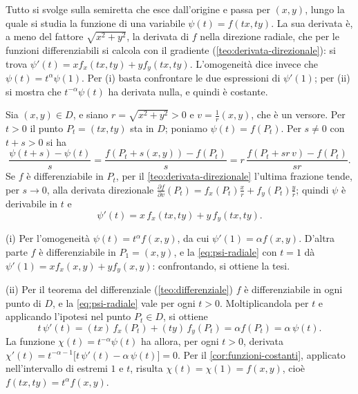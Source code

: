 \begin{schema}
\end{schema}

\begin{strategia}
Tutto si svolge sulla semiretta che esce dall'origine e passa per $(x,y)$, lungo la quale
si studia la funzione di una variabile $\psi(t)=f(tx,ty)$. La sua derivata è, a meno del
fattore $\sqrt{x^{2}+y^{2}}$, la derivata di $f$ nella direzione radiale, che per le
funzioni differenziabili si calcola con il gradiente (\cref{teo:derivata-direzionale}):
si trova $\psi'(t)=xf_{x}(tx,ty)+yf_{y}(tx,ty)$. L'omogeneità dice invece che
$\psi(t)=t^{\alpha}\psi(1)$. Per (i) basta confrontare le due espressioni di $\psi'(1)$; per
(ii) si mostra che $t^{-\alpha}\psi(t)$ ha derivata nulla, e quindi è costante.
\end{strategia}

\begin{dimostrazione}
Sia $(x,y)\in D$, e siano $r=\sqrt{x^{2}+y^{2}}>0$ e
$v=\frac1r(x,y)$, che è un versore. Per $t>0$ il punto $P_{t}=(tx,ty)$ sta in $D$; poniamo
$\psi(t)=f(P_{t})$. Per $s\neq0$ con $t+s>0$ si ha
\[
  \frac{\psi(t+s)-\psi(t)}{s}=\frac{f(P_{t}+s(x,y))-f(P_{t})}{s}
  =r\,\frac{f(P_{t}+sr\,v)-f(P_{t})}{sr} .
\]
Se $f$ è differenziabile in $P_{t}$, per il \cref{teo:derivata-direzionale} l'ultima
frazione tende, per $s\to0$, alla derivata direzionale
$\frac{\partial f}{\partial v}(P_{t})=f_{x}(P_{t})\frac xr+f_{y}(P_{t})\frac yr$; quindi
$\psi$ è derivabile in $t$ e
\begin{equation}\label{eq:psi-radiale}
  \psi'(t)=x\,f_{x}(tx,ty)+y\,f_{y}(tx,ty) .
\end{equation}

(i) Per l'omogeneità $\psi(t)=t^{\alpha}f(x,y)$, da cui $\psi'(1)=\alpha f(x,y)$. D'altra
parte $f$ è differenziabile in $P_{1}=(x,y)$, e la \eqref{eq:psi-radiale} con $t=1$ dà
$\psi'(1)=xf_{x}(x,y)+yf_{y}(x,y)$: confrontando, si ottiene la tesi.

(ii) Per il teorema del differenziale (\cref{teo:differenziale}) $f$ è differenziabile in
ogni punto di $D$, e la \eqref{eq:psi-radiale} vale per ogni $t>0$. Moltiplicandola per
$t$ e applicando l'ipotesi nel punto $P_{t}\in D$, si ottiene
\[
  t\,\psi'(t)=(tx)\,f_{x}(P_{t})+(ty)\,f_{y}(P_{t})=\alpha f(P_{t})=\alpha\,\psi(t).
\]
La funzione $\chi(t)=t^{-\alpha}\psi(t)$ ha allora, per ogni $t>0$, derivata
$\chi'(t)=t^{-\alpha-1}\bigl[t\,\psi'(t)-\alpha\,\psi(t)\bigr]=0$. Per il
\cref{cor:funzioni-costanti}, applicato nell'intervallo di estremi $1$ e $t$, risulta
$\chi(t)=\chi(1)=f(x,y)$, cioè $f(tx,ty)=t^{\alpha}f(x,y)$.
\end{dimostrazione}


